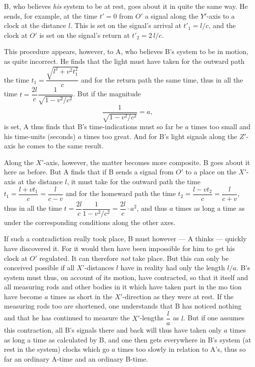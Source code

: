 \documentclass[12pt,a4paper]{article}
\begin{document}
B, who believes \emph{his} system to be at rest, goes about it in quite the
same way. He sends, for example, at the time $t' = 0$ from $O'$ a signal along
the $Y'$-axis to a clock at the distance $l$. This is set on the signal's
arrival at $t'_{1} = l/c$, and the clock at $O'$ is set on the signal's return
at $t'_{2} = 2\,l/c$.

This procedure appears, however, to A, who believes B's system to be in
motion, as quite incorrect. He finds that the light must have taken for the
outward path the time
$t_{1} = \dfrac{\sqrt{l^{2}+v^{2}t_{1}^{2}}}{c}$ and for the return path the
same time, thus in all the time
$t = \dfrac{2l}{c}\dfrac{1}{\sqrt{1-v^{2}/c^{2}}}$. But if the magnitude
\begin{equation}\tag*{1.}
  \frac{1}{\sqrt{1-v^{2}/c^{2}}} = a,
\end{equation}
is set, A thus finds that B's time-indications must so far be $a$ times too
small and his time-units (seconds) $a$ times too great. And for B's light
signals along the $Z'$-axis he comes to the same result.

Along the $X'$-axis, however, the matter becomes more composite. B goes about
it here as before. But A finds that if B sends a signal from $O'$ to a place
on the $X'$-axis at the distance $l$, it must take for the outward path the
time $t_{1} = \dfrac{l+vt_{1}}{c} = \dfrac{l}{c-v}$ and for the homeward path
the time $t_{2} = \dfrac{l-vt_{2}}{c} = \dfrac{l}{c+v}$, thus in all the time
$t = \dfrac{2l}{c}\dfrac{1}{1-v^{2}/c^{2}} = \dfrac{2l}{c}\cdot a^{2}$, and
thus $a$ times as long a time as under the corresponding conditions along the
other axes.

If such a contradiction really took place, B must however --- A thinks ---
quickly have discovered it. For it would then have been impossible for him to
get his clock at $O'$ regulated. It can therefore \emph{not} take place. But
this can only be conceived possible if all $X'$-distances $l$ have in reality
had only the length $l/a$. B's system must thus, on account of its motion,
have contracted, so that it itself and all measuring rods and other bodies in
it which have taken part in the mo\-%
tion have become $a$ times as short in the $X'$-direction as they were at
rest. If the measuring rods too are shortened, one understands that B has
noticed nothing and that he has continued to measure the $X'$-lengths
$\dfrac{l}{a}$ as $l$. But if one assumes this contraction, all B's signals
there and back will thus have taken only $a$ times as long a time as
calculated by B, and one then gets everywhere in B's system (at rest in the
system) clocks which go $a$ times too slowly in relation to A's, thus so far
an ordinary A-time and an ordinary B-time.
\end{document}
